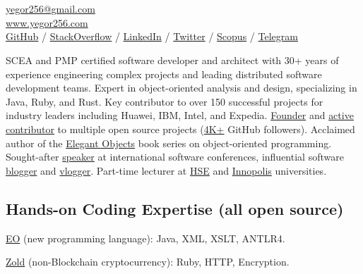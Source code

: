 \documentclass{yb}
\begin{document}
\sffamily

\ybPrintPhoto{}

\section*{\Large {}}

\small

\href{mailto:yegor256@gmail.com}{yegor256@gmail.com}\\%
\href{https://www.yegor256.com}{www.yegor256.com}\\%
\href{https://github.com/yegor256}{GitHub} /
\href{https://stackexchange.com/users/63162/yegor256}{StackOverflow} /
\href{https://www.linkedin.com/in/yegor256}{LinkedIn} /
\href{https://twitter.com/intent/follow?screen_name=yegor256}{Twitter} /
\href{https://www.scopus.com/authid/detail.uri?authorId=30367443600}{Scopus} /
\href{https://t.me/yegor256news}{Telegram}

\vspace*{12pt}

SCEA and PMP certified software developer and architect with 30+ years
  of experience engineering complex projects and leading distributed software development teams.
Expert in object-oriented analysis and design, specializing in Java, Ruby, and Rust.
Key contributor to over 150 successful projects for industry leaders including Huawei, IBM, Intel, and Expedia.
\href{https://www.yegor256.com/pets.html}{Founder} and
  \href{https://github.com/yegor256}{active contributor} to multiple open source
  projects (\href{https://github.com/yegor256}{4K+} GitHub followers).
Acclaimed author of the \href{https://www.yegor256.com/elegant-objects.html}
  {Elegant Objects} book series on object-oriented programming.
Sought-after \href{https://www.yegor256.com/talks.html}{speaker} at
  international software conferences, influential software
  \href{https://www.yegor256.com}{blogger} and
  \href{https://www.youtube.com/c/yegor256}{vlogger}.
Part-time lecturer at \href{https://www.hse.ru/en/}{HSE} and \href{https://innopolis.university/en/}{Innopolis} universities.

\subsection*{Hands-on Coding Expertise (all open source)}

\href{https://www.eolang.org}{EO} (new programming language):
Java, XML, XSLT, ANTLR4.

\href{https://www.zold.io}{Zold} (non-Blockchain cryptocurrency):
Ruby, HTTP, Encryption.
\end{document}
